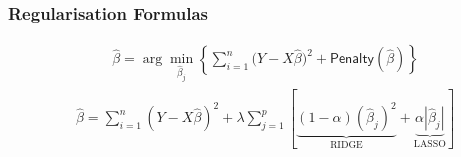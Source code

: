 \begin{frame}
   \frametitle{Regularisation Formulas}
   \begin{align*}
       & \hat{\beta}=\arg\min\limits_{\hat{\beta}_j}\left\{\sum\limits_{i=1}^n\Big(Y-X\hat{\beta}\Big)^2+\mathsf{Penalty}(\hat{\beta})\right\}                                                                 \end{align*}  
       \begin{align*}
       & \hat{\beta}=\sum\limits_{i=1}^n\left(Y-X\hat{\beta}\right)^2+\lambda\sum\limits_{j=1}^p\left[\underbrace{(1-\alpha)\left(\hat{\beta}_j\right)^2}_{\text{RIDGE}}+\underbrace{\alpha\left|\hat{\beta}_j\right|}_{\text{LASSO}}\right]
   \end{align*}
\end{frame}